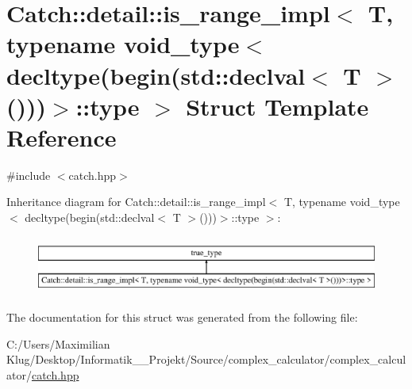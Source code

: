 \hypertarget{struct_catch_1_1detail_1_1is__range__impl_3_01_t_00_01typename_01void__type_3_01decltype_07begin8604ecb9de16ea7789f2f694ac896ffd}{}\section{Catch\+:\+:detail\+:\+:is\+\_\+range\+\_\+impl$<$ T, typename void\+\_\+type$<$ decltype(begin(std\+:\+:declval$<$ T $>$()))$>$\+:\+:type $>$ Struct Template Reference}
\label{struct_catch_1_1detail_1_1is__range__impl_3_01_t_00_01typename_01void__type_3_01decltype_07begin8604ecb9de16ea7789f2f694ac896ffd}


{\ttfamily \#include $<$catch.\+hpp$>$}

Inheritance diagram for Catch\+:\+:detail\+:\+:is\+\_\+range\+\_\+impl$<$ T, typename void\+\_\+type$<$ decltype(begin(std\+:\+:declval$<$ T $>$()))$>$\+:\+:type $>$\+:\begin{figure}[H]
\begin{center}
\leavevmode
\includegraphics[height=1.954625cm]{struct_catch_1_1detail_1_1is__range__impl_3_01_t_00_01typename_01void__type_3_01decltype_07begin8604ecb9de16ea7789f2f694ac896ffd}
\end{center}
\end{figure}


The documentation for this struct was generated from the following file\+:\begin{DoxyCompactItemize}
\item 
C\+:/\+Users/\+Maximilian Klug/\+Desktop/\+Informatik\+\_\+\_\+\+Projekt/\+Source/complex\+\_\+calculator/complex\+\_\+calculator/\mbox{\hyperlink{catch_8hpp}{catch.\+hpp}}\end{DoxyCompactItemize}

